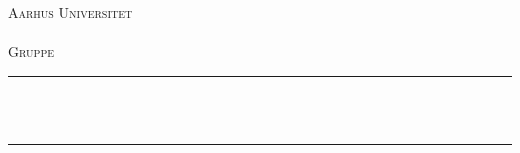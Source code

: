 \pagestyle{fancy}
\fancyhf{}
\lhead{\kursusTitel\\Gruppe \gruppeNr}
\rhead{\titlename\\ \nouppercase{\leftmark}}
\lfoot{\afleveringsdato\\}

\begin{titlepage}

\newcommand{\HRule}{\rule{\linewidth}{0.5mm}} %

\center %
 

\textsc{\LARGE Aarhus Universitet }\\[0.3cm] %
\textsc{\Large \kursusTitel }\\[0.3cm]
\textsc{\Large Gruppe \gruppeNr }\\[0.5cm] %


\HRule \\[0.4cm]
{ \huge \bfseries \titlename}\\[0.03cm]{\system} %
\HRule \\[1.5cm]

 


\end{titlepage}

